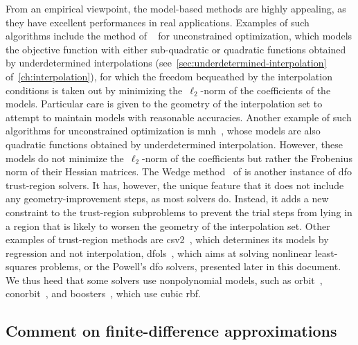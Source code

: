 From an empirical viewpoint, the model-based methods are highly appealing, as they have excellent performances in real applications.
Examples of such algorithms include the method of \citeauthor{Conn_Toint_1996}~\cite{Conn_Toint_1996} for unconstrained optimization, which models the objective function with either sub-quadratic or quadratic functions obtained by underdetermined interpolations (see~\cref{sec:underdetermined-interpolation} of~\cref{ch:interpolation}), for which the freedom bequeathed by the interpolation conditions is taken out by minimizing the~$\ell_2$-norm of the coefficients of the models.
Particular care is given to the geometry of the interpolation set to attempt to maintain models with reasonable accuracies.
Another example of such algorithms for unconstrained optimization is \gls{mnh}~\cite{Wild_2008}, whose models are also quadratic functions obtained by underdetermined interpolation.
However, these models do not minimize the~$\ell_2$-norm of the coefficients but rather the Frobenius norm of their Hessian matrices.
The Wedge method~\cite{Marazzi_Nocedal_2002} of \citeauthor{Marazzi_Nocedal_2002} is another instance of \gls{dfo} trust-region solvers.
It has, however, the unique feature that it does not include any geometry-improvement steps, as most solvers do.
Instead, it adds a new constraint to the trust-region subproblems to prevent the trial steps from lying in a region that is likely to worsen the geometry of the interpolation set.
Other examples of trust-region methods are \gls{csv2}~\cite{Billups_Larson_Graf_2013}, which determines its models by regression and not interpolation, \gls{dfols}~\cite{Cartis_Etal_2019}, which aims at solving nonlinear least-squares problems, or the Powell's \gls{dfo} solvers, presented later in this document.
We thus heed that some solvers use nonpolynomial models, such as \gls{orbit}~\cite{Wild_Regis_Shoemaker_2008}, \gls{conorbit}~\cite{Regis_Wild_2017}, and \gls{boosters}~\cite{Oeuvray_Bierlaire_2009}, which use cubic \gls{rbf}.

\subsection{Comment on finite-difference approximations}

